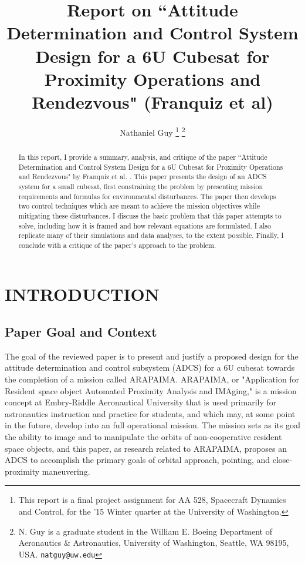 \documentclass[letterpaper, 11 pt, conference]{ieeeconf}  %
\title{\LARGE \bf
Report on ``Attitude Determination and Control System Design for a 6U Cubesat for Proximity Operations and Rendezvous" (Franquiz et al)
}
\author{Nathaniel Guy%
\thanks{This report is a final project assignment for AA 528, Spacecraft Dynamics and Control, for the '15 Winter quarter at the University of Washington.}
\thanks{N. Guy is a graduate student in the William E. Boeing Department of Aeronautics \& Astronautics, University of Washington, Seattle, WA 98195, USA.
        {\tt\small natguy@uw.edu}}%
}
\begin{document}
\maketitle
\thispagestyle{empty}
\pagestyle{empty}

\begin{abstract}

In this report, I provide a summary, analysis, and critique of the paper ``Attitude Determination and Control System Design for a 6U Cubesat for Proximity Operations and Rendezvous" by Franquiz et al. \cite{franquiz}. This paper presents the design of an ADCS system for a small cubesat, first constraining the problem by presenting mission requirements and formulas for environmental disturbances. The paper then develops two control techniques which are meant to achieve the mission objectives while mitigating these disturbances. I discuss the basic problem that this paper attempts to solve, including how it is framed and how relevant equations are formulated. I also replicate many of their simulations and data analyses, to the extent possible. Finally, I conclude with a critique of the paper's approach to the problem.

\end{abstract}

\section{INTRODUCTION}

\subsection{Paper Goal and Context}

The goal of the reviewed paper is to present and justify a proposed design for the attitude determination and control subsystem (ADCS) for a 6U cubesat towards the completion of a mission called ARAPAIMA. ARAPAIMA, or "Application for Resident space object Automated Proximity Analysis and IMAging," is a mission concept at Embry-Riddle Aeronautical University that is used primarily for astronautics instruction and practice for students, and which may, at some point in the future, develop into an full operational mission. The mission sets as its goal the ability to image and to manipulate the orbits of non-cooperative resident space objects, and this paper, as research related to ARAPAIMA, proposes an ADCS to accomplish the primary goals of orbital approach, pointing, and close-proximity maneuvering.
\end{document}

